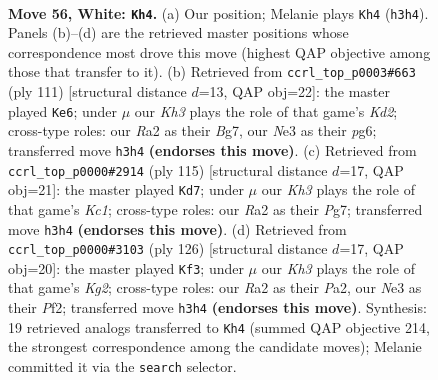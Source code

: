 \documentclass[11pt]{article}
\begin{document}
\clearpage

\begin{figure}[p]\centering
\begin{subfigure}{0.46\textwidth}\centering
\resizebox{\linewidth}{!}{%
\newchessgame
\chessboard[
  setfen={7k/1r4b1/8/6R1/2P5/4N2K/R7/8 w - - 32 56},
  showmover=false,
  pgfstyle=straightmove, color=movearrow, markmove={h3-h4}
]}
\caption{}
\end{subfigure}\hfill
\begin{subfigure}{0.46\textwidth}\centering
\resizebox{\linewidth}{!}{%
\newchessgame
\chessboard[
  setfen={8/3k2b1/6P1/7p/8/R3BK2/8/4r3 b - - 0 56},
  showmover=false,
  pgfstyle=straightmove, color=movearrow, markmove={d7-e6}
]}
\caption{}
\end{subfigure}
\\[4pt]
\begin{subfigure}{0.46\textwidth}\centering
\resizebox{\linewidth}{!}{%
\newchessgame
\chessboard[
  setfen={2k5/6p1/8/8/2K5/6r1/8/1R4B1 b - - 0 58},
  showmover=false,
  pgfstyle=straightmove, color=movearrow, markmove={c8-d7}
]}
\caption{}
\end{subfigure}\hfill
\begin{subfigure}{0.46\textwidth}\centering
\resizebox{\linewidth}{!}{%
\newchessgame
\chessboard[
  setfen={8/7k/1R6/4P3/1b1r4/8/P4PK1/8 w - - 0 64},
  showmover=false,
  pgfstyle=straightmove, color=movearrow, markmove={g2-f3}
]}
\caption{}
\end{subfigure}
\caption{\textbf{Move 56, White: \texttt{Kh4}.} (a) Our position; Melanie plays \texttt{Kh4} (\texttt{h3h4}). Panels (b)--(d) are the retrieved master positions whose correspondence most drove this move (highest QAP objective among those that transfer to it). (b) Retrieved from \texttt{ccrl\_top\_p0003\#663} (ply 111) [structural distance $d$=13, QAP obj=22]: the master played \texttt{Ke6}; under $\mu$ our \emph{Kh3} plays the role of that game's \emph{Kd2}; cross-type roles: our \emph{R}a2 as their \emph{B}g7, our \emph{N}e3 as their \emph{p}g6; transferred move \texttt{h3h4} \textbf{(endorses this move)}. (c) Retrieved from \texttt{ccrl\_top\_p0000\#2914} (ply 115) [structural distance $d$=17, QAP obj=21]: the master played \texttt{Kd7}; under $\mu$ our \emph{Kh3} plays the role of that game's \emph{Kc1}; cross-type roles: our \emph{R}a2 as their \emph{P}g7; transferred move \texttt{h3h4} \textbf{(endorses this move)}. (d) Retrieved from \texttt{ccrl\_top\_p0000\#3103} (ply 126) [structural distance $d$=17, QAP obj=20]: the master played \texttt{Kf3}; under $\mu$ our \emph{Kh3} plays the role of that game's \emph{Kg2}; cross-type roles: our \emph{R}a2 as their \emph{P}a2, our \emph{N}e3 as their \emph{P}f2; transferred move \texttt{h3h4} \textbf{(endorses this move)}. Synthesis: 19 retrieved analogs transferred to \texttt{Kh4} (summed QAP objective 214, the strongest correspondence among the candidate moves); Melanie committed it via the \texttt{search} selector.}
\label{fig:thought-m110}
\end{figure}
\end{document}
